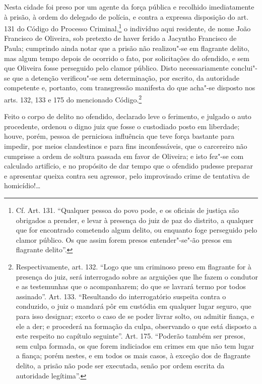 \noindent{}Nesta cidade foi preso por um agente da força pública e recolhido
imediatamente à prisão, à ordem do delegado de polícia, e contra a
expressa disposição do art. 131 do Código do Processo
Criminal,\footnote{Cf. Art. 131. ``Qualquer pessoa do povo pode, e os
  oficiais de justiça são obrigados a prender, e levar à presença do
  juiz de paz do distrito, a qualquer que for encontrado cometendo algum
  delito, ou enquanto foge perseguido pelo clamor público. Os que assim
  forem presos entender"-se"-ão presos em flagrante delito''.} o indivíduo
aqui residente, de nome João Francisco de Oliveira, sob pretexto de
haver ferido a Jacyntho Francisco de Paula; cumprindo ainda notar que a
prisão não realizou"-se em flagrante delito, mas algum tempo depois de
ocorrido o fato, por solicitações do ofendido, e sem que Oliveira fosse
perseguido pelo clamor público. Disto necessariamente conclui"-se que a
detenção verificou"-se sem determinação, por escrito, da autoridade
competente e, portanto, com transgressão manifesta do que acha"-se
disposto nos arts. 132, 133 e 175 do mencionado Código.\footnote{Respectivamente, art. 132. ``Logo que um criminoso preso em flagrante
  for à presença do juiz, será interrogado sobre as arguições que lhe
  fazem o condutor e as testemunhas que o acompanharem; do que se
  lavrará termo por todos assinado''. Art. 133. ``Resultando do
  interrogatório suspeita contra o conduzido, o juiz o mandará pôr em
  custódia em qualquer lugar seguro, que para isso designar; exceto o
  caso de se poder livrar solto, ou admitir fiança, e ele a der; e
  procederá na formação da culpa, observando o que está disposto a este
  respeito no capítulo seguinte''. Art. 175. ``Poderão também ser presos,
  sem culpa formada, os que forem indiciados em crimes em que não tem
  lugar a fiança; porém nestes, e em todos os mais casos, à exceção dos
  de flagrante delito, a prisão não pode ser executada, senão por ordem
  escrita da autoridade legítima''.}

Feito o corpo de delito no ofendido, declarado leve o ferimento, e
julgado o auto procedente, ordenou o digno juiz que fosse o custodiado
posto em liberdade; houve, porém, pessoa de perniciosa influência que
teve força bastante para impedir, por meios clandestinos e para fins
inconfessáveis, que o carcereiro não cumprisse a ordem de soltura
passada em favor de Oliveira; e isto fez"-se com calculado artifício, e
no propósito de dar tempo que o ofendido pudesse preparar e apresentar
queixa contra seu agressor, pelo improvisado crime de tentativa de
homicídio!\ldots{}


